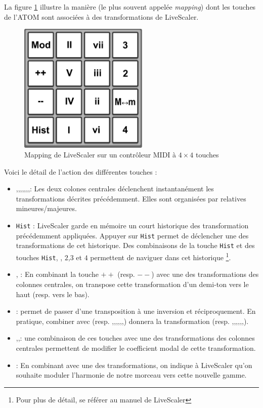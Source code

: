 
La figure \ref{fig:mapping-ATOM} illustre la manière (le plus souvent appelée \emph{mapping}) dont les touches de l'ATOM sont associées à des transformations de LiveScaler.

\begin{figure}[htbp]
  \centering
  \includegraphics[width=0.55\textwidth]{Figures/Pads-config.pdf}
  \caption{Mapping de LiveScaler sur un contrôleur MIDI à $4\times 4$ touches\label{fig:mapping-ATOM}}
\end{figure}

Voici le détail de l'action des différentes touches : 
\begin{itemize}
  \item \LSI,\LSvi,\LSIV,\LSII,\LSV,\LSiii,\LSII,\LSvii :  Les deux colones centrales déclenchent instantanément les transformations décrites précédemment. Elles sont organisées par relatives mineures/majeures.
  \item \texttt{Hist} : LiveScaler garde en mémoire un court historique des transformation précédemment appliquées. Appuyer sur \texttt{Hist} permet de déclencher une des transformations de cet historique. Des combinaisons de la touche \texttt{Hist} et des touches \texttt{Hist}, \LSMm, $2$,$3$ et $4$ permettent de naviguer dans cet historique \footnote{Pour plus de détail, se référer au manuel de LiveScaler}. 
  \item \LSpp, \LSmm : En combinant la touche $++$ (resp. $--$) avec une des transformations des colonnes centrales, on transpose cette transformation d'un demi-ton vers le haut (resp. vers le bas). 
  \item  \LSMm : permet de passer d'une transposition à une inversion et réciproquement. En pratique, combiner \LSMm avec \LSI (resp. \LSvi,\LSIV,\LSII,\LSV,\LSiii,\LSII,\LSvii) donnera la transformation \LSI (resp. \LSvi,\LSIV,\LSII,\LSV,\LSiii,\LSII,\LSvii).
  \item \LStwo,\LSthree,\LSfour : une combinaison de ces touches avec une des transformations des colonnes centrales permettent de modifier le coefficient modal de cette transformation.
  \item \LSMod : En combinant \LSMod avec une des transformations, on indique à LiveScaler qu'on souhaite moduler l'harmonie de notre morceau vers cette nouvelle gamme. 
\end{itemize}

